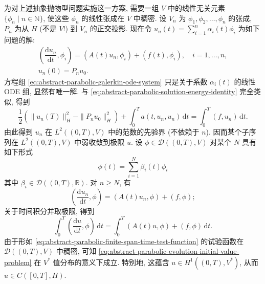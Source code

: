 为对上述抽象抛物型问题实施这一方案, 需要一组 $V$ 中的线性无关元素 $\{\phi_n\mid n\in\mathbb{N}\}$, 使这些 $\phi_n$ 的线性张成在 $V$ 中稠密. 设 $V_n$ 为 $\phi_1,\phi_2,\ldots,\phi_n$ 的张成, $P_n$ 为从 $H$ (不是 $V$!) 到 $V_n$ 的正交投影. 现在令 $u_n(t)=\sum_{i=1}^n\alpha_i(t)\phi_i$ 为如下问题的解:
\begin{equation}\label{eq:abstract-parabolic-galerkin-ode-system}
\begin{gathered}\left(\dfrac{\mathrm{d}u_n}{\mathrm{d}t},\phi_i\right)=(A(t)u_n,\phi_i)+(f(t),\phi_i),\quad i=1,\ldots,n,\\u_n(0)=P_nu_0.\end{gathered}
\end{equation}
方程组 \eqref{eq:abstract-parabolic-galerkin-ode-system} 只是关于系数 $\alpha_i(t)$ 的线性 ODE 组, 显然有唯一解. 与 \eqref{eq:abstract-parabolic-solution-energy-identity} 完全类似, 得到
\begin{equation}\label{eq:abstract-parabolic-galerkin-energy-identity}
\dfrac{1}{2}(\|u_n(T)\|_H^2-\|P_nu_0\|_H^2)+\int_0^T a(t,u_n,u_n)\,\mathrm{d}t=\int_0^T(f,u_n)\,\mathrm{d}t.
\end{equation}
由此得到 $u_n$ 在 $L^2((0,T),\allowbreak V)$ 中的范数的先验界 (不依赖于 $n$). 因而某个子序列在 $L^2((0,T),\allowbreak V)$ 中弱收敛到极限 $u$. 设 $\phi\in\mathcal{D}((0,T),V)$ 对某个 $N$ 具有如下形式
\begin{equation}\label{eq:abstract-parabolic-finite-span-time-test-function}
\phi(t)=\sum_{i=1}^N\beta_i(t)\phi_i
\end{equation}
其中 $\beta_i\in\mathcal{D}((0,T),\mathbb{R})$. 对 $n\geq N$, 有
\begin{equation}\label{eq:abstract-parabolic-galerkin-finite-test-identity}
\left(\dfrac{\mathrm{d}u_n}{\mathrm{d}t},\phi\right)=(A(t)u_n,\phi)+(f,\phi);
\end{equation}
关于时间积分并取极限, 得到
\begin{equation}\label{eq:abstract-parabolic-galerkin-distributional-limit}
\int_0^T\left(\dfrac{\mathrm{d}u}{\mathrm{d}t},\phi\right)\,\mathrm{d}t=\int_0^T(A(t)u,\phi)+(f,\phi)\,\mathrm{d}t.
\end{equation}
由于形如 \eqref{eq:abstract-parabolic-finite-span-time-test-function} 的试验函数在 $\mathcal{D}((0,T),V)$ 中稠密, 可知 \eqref{eq:abstract-parabolic-evolution-initial-value-problem} 在 $V^*$ 值分布的意义下成立. 特别地, 这蕴含 $u\in H^1((0,T),V^*)$, 从而 $u\in C([0,T],H)$.


